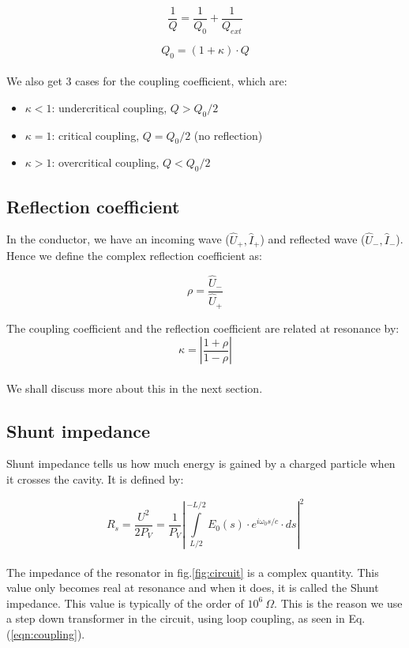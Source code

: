 \documentclass[a4paper]{article}
\numberwithin{equation}{section}
\begin{document}
\[
		\frac{1}{Q} = \frac{1}{Q_{0}} + \frac{1}{Q_{ext}}
\]

\begin{equation} \label{eqn:quality}
		Q_{0} = \left(1 + \kappa\right)\cdot Q
\end{equation}
\\
We also get 3 cases for the coupling coefficient, which are: 
\begin{itemize}
		\item $\kappa < 1$: undercritical coupling, $Q>Q_{0}/2$
		\item $\kappa = 1$: critical coupling, $Q = Q_{0}/2$ (no reflection)
		\item $\kappa > 1$: overcritical coupling, $Q<Q_{0}/2$ 
\end{itemize}

\subsection{Reflection coefficient}
In the conductor, we have an incoming wave ($\hat{U}_{+}, \hat{I}_{+}$) and
reflected wave ($\hat{U}_{-}, \hat{I}_{-}$). Hence we define the complex
reflection coefficient as:

\begin{equation} \label{eqn:refleccoeff}
		\rho = \frac{\hat{U}_{-}}{\hat{U}_{+}}
\end{equation}

The coupling coefficient and the reflection coefficient are related at resonance
by: 
\\
\begin{equation}
		\kappa = \left|\frac{1 + \rho}{1 - \rho} \right| 
\end{equation}
\\
We shall discuss more about this in the next section.

\subsection{Shunt impedance}
Shunt impedance tells us how much energy is gained by a charged particle when it
crosses the cavity. It is defined by: 

\begin{equation} \label{eqn:shunt}
		R_{s} = \frac{U^2}{2 P_{V}} = \frac{1}{P_{V}} \left|\int\limits_{L/2}^{-L/2} E_{0}\left(s \right) \cdot e^{i \omega_{0}s/c}\cdot ds \right|^2 
\end{equation}
\\
The impedance of the resonator in fig.\ref{fig:circuit} is a complex quantity. This value only becomes real at resonance and when it does, it is called the Shunt impedance. This value is typically of the order of $10^{6} \  \Omega$. This is the reason we use a step down transformer in the circuit, using loop coupling, as seen in Eq.(\ref{eqn:coupling}). 
\end{document}
